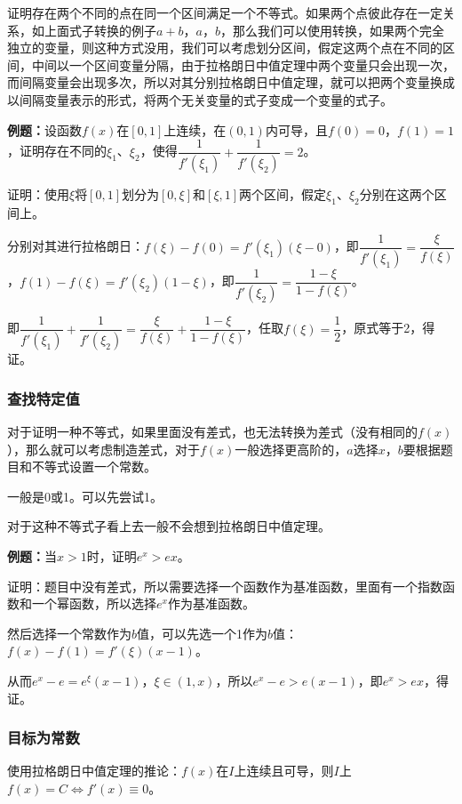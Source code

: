 证明存在两个不同的点在同一个区间满足一个不等式。如果两个点彼此存在一定关系，如上面式子转换的例子$a+b$，$a$，$b$，那么我们可以使用转换，如果两个完全独立的变量，则这种方式没用，我们可以考虑划分区间，假定这两个点在不同的区间，中间以一个区间变量分隔，由于拉格朗日中值定理中两个变量只会出现一次，而间隔变量会出现多次，所以对其分别拉格朗日中值定理，就可以把两个变量换成以间隔变量表示的形式，将两个无关变量的式子变成一个变量的式子。

\textbf{例题：}设函数$f(x)$在$[0,1]$上连续，在$(0,1)$内可导，且$f(0)=0$，$f(1)=1$，证明存在不同的$\xi_1$、$\xi_2$，使得$\dfrac{1}{f'(\xi_1)}+\dfrac{1}{f'(\xi_2)}=2$。

证明：使用$\xi$将$[0,1]$划分为$[0,\xi]$和$[\xi,1]$两个区间，假定$\xi_1$、$\xi_2$分别在这两个区间上。

分别对其进行拉格朗日：$f(\xi)-f(0)=f'(\xi_1)(\xi-0)$，即$\dfrac{1}{f'(\xi_1)}=\dfrac{\xi}{f(\xi)}$，$f(1)-f(\xi)=f'(\xi_2)(1-\xi)$，即$\dfrac{1}{f'(\xi_2)}=\dfrac{1-\xi}{1-f(\xi)}$。

即$\dfrac{1}{f'(\xi_1)}+\dfrac{1}{f'(\xi_2)}=\dfrac{\xi}{f(\xi)}+\dfrac{1-\xi}{1-f(\xi)}$，任取$f(\xi)=\dfrac{1}{2}$，原式等于2，得证。

\subsubsection{查找特定值}

对于证明一种不等式，如果里面没有差式，也无法转换为差式（没有相同的$f(x)$），那么就可以考虑制造差式，对于$f(x)$一般选择更高阶的，$a$选择$x$，$b$要根据题目和不等式设置一个常数。

一般是0或1。可以先尝试1。

对于这种不等式子看上去一般不会想到拉格朗日中值定理。

\textbf{例题：}当$x>1$时，证明$e^x>ex$。

证明：题目中没有差式，所以需要选择一个函数作为基准函数，里面有一个指数函数和一个幂函数，所以选择$e^x$作为基准函数。

然后选择一个常数作为$b$值，可以先选一个1作为$b$值：$f(x)-f(1)=f'(\xi)(x-1)$。

从而$e^x-e=e^\xi(x-1)$，$\xi\in(1,x)$，所以$e^x-e>e(x-1)$，即$e^x>ex$，得证。

\subsubsection{目标为常数}

使用拉格朗日中值定理的推论：$f(x)$在$I$上连续且可导，则$I$上$f(x)=C\Leftrightarrow f'(x)\equiv 0$。

